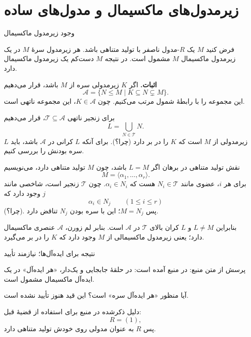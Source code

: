 \section{زیرمدول‌های ماکسیمال و مدول‌های ساده}

\begin{frame}[t]{وجود زیرمدول ماکسیمال}
    \label{lec05:maximal-existence}
    \begin{theorem}
        فرض کنید $M$ یک $R$-مدول ناصفر با \alert{تولید متناهی} باشد.
        هر زیرمدول سرهٔ $M$ در یک زیرمدول ماکسیمال $M$ مشمول است.
        در نتیجه $M$ دست‌کم یک زیرمدول ماکسیمال دارد.
    \end{theorem}
    \textbf{اثبات.} اگر $K$ زیرمدولی سره از $M$ باشد، قرار می‌دهیم
    \[
        \mathcal{A}=\{N\leq M\mid K\subseteq N\subsetneq M\}.
    \]
    این مجموعه را با رابطهٔ شمول مرتب می‌کنیم.
    چون $K\in\mathcal{A}$، این مجموعه ناتهی است.

    برای زنجیر ناتهی $\mathcal{T}\subseteq\mathcal{A}$، قرار می‌دهیم
    \[
        L=\bigcup_{N\in\mathcal{T}}N.
    \]
    $L$ زیرمدولی از $M$ است که $K$ را در بر دارد (چرا؟).
    برای آنکه $L$ کرانی در $\mathcal{A}$ باشد، باید سره بودنش را بررسی کنیم.
\end{frame}

\begin{frame}[t]{نقش تولید متناهی در برهان}
    \label{lec05:finite-generation-proof}
    اگر $L=M$ باشد، چون $M$ تولید متناهی دارد، می‌نویسیم
    \[
        M=\langle\alpha_1,\ldots,\alpha_r\rangle.
    \]
    برای هر $i$، عضوی مانند $N_i\in\mathcal{T}$ هست که $\alpha_i\in N_i$.
    چون $\mathcal{T}$ زنجیر است، شاخصی مانند $j$ وجود دارد که
    \[
        \alpha_i\in N_j\qquad(1\leq i\leq r)
    \]
    (چرا؟). پس $M=N_j$؛ این با سره بودن $N_j$ تناقض دارد.

    بنابراین $L\neq M$ و $L$ کران بالای $\mathcal{T}$ در $\mathcal{A}$ است.
    بنابر لم زورن، $\mathcal{A}$ عنصری ماکسیمال دارد؛
    یعنی زیرمدول ماکسیمالی از $M$ وجود دارد که $K$ را در بر می‌گیرد.
\end{frame}

\begin{frame}[t]{نتیجه برای ایده‌آل‌ها؛ نیازمند تأیید}
    \label{lec05:ideal-corollary-pending}
    \begin{alertblock}{پرسش از متن منبع: }
        در منبع آمده است: در حلقهٔ جابجایی و یک‌دار،
        «هر ایده‌آل» در یک ایده‌آل ماکسیمال مشمول است.

        آیا منظور «هر ایده‌آل \alert{سره}» است؟
        این قید هنوز تأیید نشده است.
    \end{alertblock}
    دلیل ذکرشده در منبع برای استفاده از قضیهٔ قبل:
    \[
        R=(1),
    \]
    پس $R$ به عنوان مدولی روی خودش تولید متناهی دارد.
\end{frame}

